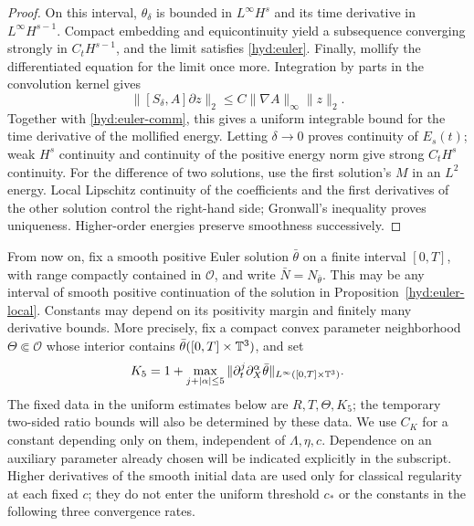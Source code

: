 \begin{proof}
 On this interval, $\theta_\delta$ is bounded in $L^\infty H^s$ and its
 time derivative in $L^\infty H^{s-1}$. Compact embedding and
 equicontinuity yield a subsequence converging strongly in
 $C_tH^{s-1}$, and the limit satisfies \eqref{hyd:euler}.
 Finally, mollify the differentiated equation for the limit once more.
 Integration by parts in the convolution kernel gives
 \[
 \|[S_\delta,A]\partial z\|_2
 \le C\|\nabla A\|_\infty\|z\|_2.
 \]
 Together with \eqref{hyd:euler-comm}, this gives a uniform integrable
 bound for the time derivative of the mollified energy. Letting
 $\delta\to0$ proves continuity of $E_s(t)$; weak $H^s$ continuity and
 continuity of the positive energy norm give strong $C_tH^s$ continuity.
 For the difference of two solutions, use the first solution's $M$ in
 an $L^2$ energy. Local Lipschitz continuity of the coefficients and the
 first derivatives of the other solution control the right-hand side;
 Gronwall's inequality proves uniqueness. Higher-order energies preserve
 smoothness successively.
\end{proof}

From now on, fix a smooth positive Euler solution $\bar\theta$ on a finite
interval $[0,T]$, with range compactly contained in $\mathcal O$, and write
$\bar N=N_{\bar\theta}$. This may be any interval of smooth positive
continuation of the solution in Proposition~\ref{hyd:euler-local}.
Constants may depend on its positivity margin and finitely many
derivative bounds. More precisely, fix a compact convex parameter
neighborhood $\Theta\Subset\mathcal O$ whose interior contains
$\bar\theta([0,T]\times\mathbb T^3)$, and set
\[
 K_5=1+\max_{j+|\alpha|\le5}
       \|\partial_t^j\partial_X^\alpha\bar\theta\|_{L^\infty([0,T]\times\mathbb T^3)}.
\]
The fixed data in the uniform estimates below are $R,T,\Theta,K_5$;
the temporary two-sided ratio bounds will also be determined by these
data. We use $C_K$ for a constant depending only on them, independent of
$\Lambda,\eta,c$. Dependence on an auxiliary parameter already chosen
will be indicated explicitly in the subscript. Higher derivatives of
the smooth initial data are used only for classical regularity at each
fixed $c$; they do not enter the uniform threshold $c_*$ or the constants
in the following three convergence rates.

